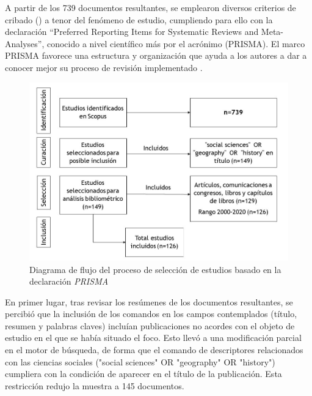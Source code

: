 \documentclass[spanish]{textolivre}
\begin{document}
A partir de los 739 documentos resultantes, se emplearon diversos criterios de cribado () a tenor del fenómeno de estudio, cumpliendo para ello con la declaración “Preferred Reporting Items for Systematic Reviews and Meta-Analyses”, conocido a nivel científico más por el acrónimo (PRISMA). El marco PRISMA favorece una estructura y organización que ayuda a los autores a dar a conocer mejor su proceso de revisión implementado \cite{garcia2022developing}.

\begin{figure}[h!]
\centering
\begin{minipage}{.8\textwidth}
 \includegraphics[width=\textwidth]{fig1.jpg}
 \caption{ Diagrama de flujo del proceso de selección de estudios basado en la declaración \emph{PRISMA}}
 \label{fig1}
\end{minipage}
\end{figure}

En primer lugar, tras revisar los resúmenes de los documentos resultantes, se percibió que la inclusión de los comandos en los campos contemplados (título, resumen y palabras claves) incluían publicaciones no acordes con el objeto de estudio en el que se había situado el foco. Esto llevó a una modificación parcial en el motor de búsqueda, de forma que el comando de descriptores relacionados con las ciencias sociales ("social sciences" OR "geography" OR "history") cumpliera con la condición de aparecer en el título de la publicación. Esta restricción redujo la muestra a 145 documentos.  
\end{document}
